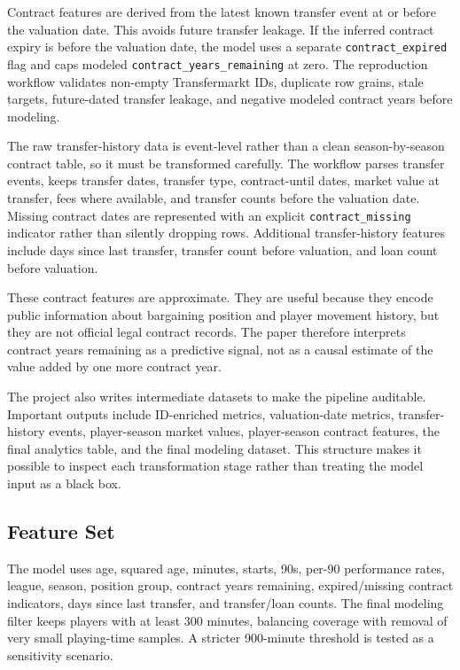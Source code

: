 \documentclass[conference]{IEEEtran}
\begin{document}
Contract features are derived from the latest known transfer event at or before the valuation date. This avoids future transfer leakage. If the inferred contract expiry is before the valuation date, the model uses a separate \texttt{contract\_expired} flag and caps modeled \texttt{contract\_years\_remaining} at zero. The reproduction workflow validates non-empty Transfermarkt IDs, duplicate row grains, stale targets, future-dated transfer leakage, and negative modeled contract years before modeling.

The raw transfer-history data is event-level rather than a clean season-by-season contract table, so it must be transformed carefully. The workflow parses transfer events, keeps transfer dates, transfer type, contract-until dates, market value at transfer, fees where available, and transfer counts before the valuation date. Missing contract dates are represented with an explicit \texttt{contract\_missing} indicator rather than silently dropping rows. Additional transfer-history features include days since last transfer, transfer count before valuation, and loan count before valuation.

These contract features are approximate. They are useful because they encode public information about bargaining position and player movement history, but they are not official legal contract records. The paper therefore interprets contract years remaining as a predictive signal, not as a causal estimate of the value added by one more contract year.

The project also writes intermediate datasets to make the pipeline auditable. Important outputs include ID-enriched metrics, valuation-date metrics, transfer-history events, player-season market values, player-season contract features, the final analytics table, and the final modeling dataset. This structure makes it possible to inspect each transformation stage rather than treating the model input as a black box.

\subsection{Feature Set}
The model uses age, squared age, minutes, starts, 90s, per-90 performance rates, league, season, position group, contract years remaining, expired/missing contract indicators, days since last transfer, and transfer/loan counts. The final modeling filter keeps players with at least 300 minutes, balancing coverage with removal of very small playing-time samples. A stricter 900-minute threshold is tested as a sensitivity scenario.
\end{document}
